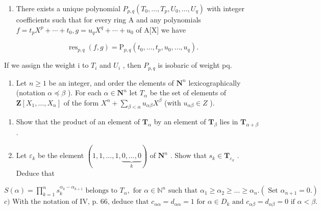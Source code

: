 \begin{enumerate}
\def\labelenumi{\arabic{enumi})}
\setcounter{enumi}{11}
\tightlist
\item
  There exists a unique polynomial \(P_{p,q}(T_{0},\ldots,T_{p},U_{0},\ldots,U_{q})\) with integer coefficients such that for every ring A and any polynomials \(f=t_{p}X^{p}+\cdots+t_{0}, g=u_{q}X^{q}+\cdots+u_{0}\) of A{[}X{]} we have
\end{enumerate}

\[
\operatorname{res} _ {p, q} (f, g) = \mathrm{P} _ {p, q} \left(t _ {0}, \dots , t _ {p}, u _ {0}, \dots , u _ {q}\right).
\]

If we assign the weight i to \(T_{i}\) and \(U_{i}\) , then \(P_{p,q}\) is isobaric of weight pq.

\begin{enumerate}
\def\labelenumi{\arabic{enumi})}
\setcounter{enumi}{12}
\tightlist
\item
  Let \(n \geqslant 1\) be an integer, and order the elements of \(\mathbf{N}^n\) lexicographically (notation \(\alpha \preccurlyeq \beta\) ). For each \(\alpha \in \mathbf{N}^n\) let \(T_{\alpha}\) be the set of elements of \(\mathbf{Z}[X_1, \ldots, X_n]\) of the form \(X^{\alpha} + \sum_{\beta < \alpha} u_{\alpha\beta} X^{\beta}\) (with \(u_{\alpha\beta} \in Z\) ).
\end{enumerate}

\begin{enumerate}
\def\labelenumi{\alph{enumi})}
\tightlist
\item
  Show that the product of an element of \(\mathbf{T}_{\alpha}\) by an element of \(\mathbf{T}_{\beta}\) lies in \(\mathbf{T}_{\alpha + \beta}\) .\\
\item
  Let \(\varepsilon_{k}\) be the element \((1, 1, \ldots, 1, \underbrace{0, \ldots, 0}_{k})\) of \(\mathbf{N}^{n}\) . Show that \(s_{k} \in \mathbf{T}_{\varepsilon_{k}}\) . Deduce that
\end{enumerate}

\(S(\alpha) = \prod_{k=1}^{n} s_k^{\alpha_k - \alpha_{k+1}} \text{ belongs to } T_\alpha, \text{ for } \alpha \in \mathbb{N}^n \text{ such that } \alpha_1 \geqslant \alpha_2 \geqslant \ldots \geqslant \alpha_n. (\text{ Set } \alpha_{n+1} = 0.)\) \(c) \text{ With the notation of IV, p. 66, deduce that } c_{\alpha\alpha} = d_{\alpha\alpha} = 1 \text{ for } \alpha \in D_k \text{ and } c_{\alpha\beta} = d_{\alpha\beta} = 0 \text{ if } \alpha < \beta.\)

